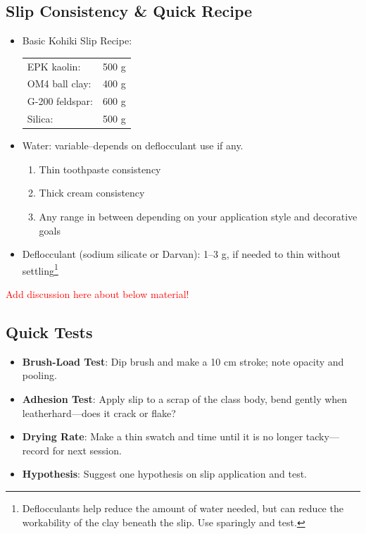 \documentclass[12pt]{scrartcl}
\begin{document}
\subsection*{Slip Consistency \& Quick Recipe}
\begin{itemize}
\item Basic Kohiki Slip Recipe:\\[2pt]
    \begin{tabular}{@{}ll@{}}
        EPK kaolin:      & 500 g \\
        OM4 ball clay:   & 400 g \\
        G-200 feldspar:  & 600 g \\
        Silica:          & 500 g \\
    \end{tabular}
  \item Water: variable--depends on deflocculant use if any.
  \begin{enumerate}
    \item Thin toothpaste consistency
    \item Thick cream consistency
    \item Any range in between depending on your application style and decorative goals
  \end{enumerate}
  \item Deflocculant (sodium silicate or Darvan): 1--3 g, if needed to thin without settling\footnote{Deflocculants help reduce the amount of water needed, but can reduce the workability of the clay beneath the slip. Use sparingly and test.}
\end{itemize}

\textcolor{red}{Add discussion here about below material!}

\subsection*{Quick Tests}
\begin{itemize}
  \item \textbf{Brush-Load Test}: Dip brush and make a 10 cm stroke; note opacity and pooling.
  \item \textbf{Adhesion Test}: Apply slip to a scrap of the class body, bend gently when leatherhard—does it crack or flake?
  \item \textbf{Drying Rate}: Make a thin swatch and time until it is no longer tacky—record for next session.
  \item \textbf{Hypothesis}: Suggest one hypothesis on slip application and test.
\end{itemize}
\end{document}
